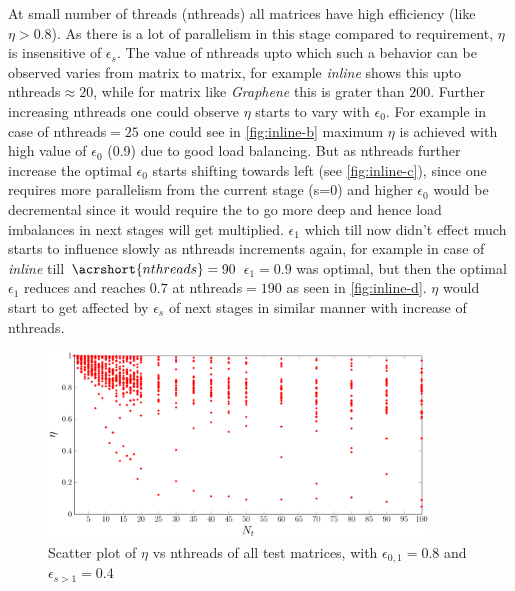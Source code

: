 At small number of threads (\acrshort{nthreads}) all matrices have high efficiency (like $\eta>0.8$). As there is a lot of parallelism in this stage compared to requirement, $\eta$ is insensitive of $\epsilon_s$. The value of \acrshort{nthreads} upto which such a behavior can be observed varies from matrix to matrix, for example \emph{inline} shows this upto \acrshort{nthreads}$\approx20$, while for matrix like \emph{Graphene} this is grater than $200$.  Further increasing \acrshort{nthreads} one could observe $\eta$ starts to vary with $\epsilon_0$. For example in case of \acrshort{nthreads}$ = 25$ one could see in \cref{fig:inline-b} maximum $\eta$ is achieved with high value of $\epsilon_0$ (0.9) due to good load balancing. But as 
\acrshort{nthreads} further increase the optimal $\epsilon_0$ starts shifting towards left (see \cref{fig:inline-c}),
 since one requires more parallelism from the current stage (s=0) and higher $\epsilon_0$ would be decremental since it would require the \levelTree to go more deep and hence load imbalances in next stages will get multiplied. $\epsilon_1$ which till now didn't effect much starts to influence slowly as \acrshort{nthreads} increments again, for example in case of \emph{inline} till $\acrshort{nthreads}=90$ $\epsilon_1=0.9$ was optimal, but then the optimal $\epsilon_1$ reduces and reaches $0.7$ at \acrshort{nthreads}$=190$ as seen in \cref{fig:inline-d}. $\eta$ would start to get affected by $\epsilon_s$ of next stages in similar manner with increase of \acrshort{nthreads}.
 
   \begin{figure}[tbhp]
   	\centering
   	\includegraphics[height=0.19\textheight,width=0.9\textwidth]{pics/param_study/scatter_plot}
   	\caption{Scatter plot of $\eta$ vs \acrshort{nthreads} of all test matrices, with $\epsilon_{0,1} = 0.8$ and $\epsilon_{s>1} = 0.4$}
   	\label{fig:param_all_mtx_stat}
   \end{figure}
   
